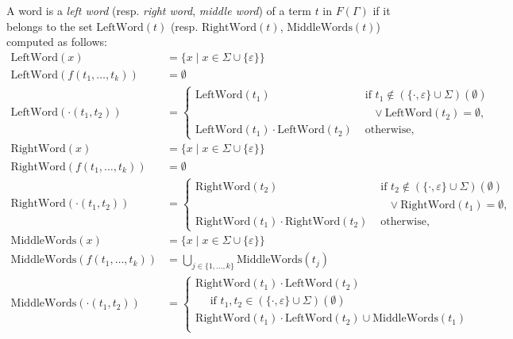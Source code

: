 \documentclass[a4paper]{llncs}
\begin{document}
  \begin{definition}
        A word is a \emph{left word} (resp. \emph{right word}, \emph{middle word}) of a term $t$ in $F(\Gamma)$ if it belongs to the set $\mathrm{LeftWord}(t)$ (resp. $\mathrm{RightWord}(t)$, $\mathrm{MiddleWords}(t)$) computed as follows:
        \begin{align*}
          \mathrm{LeftWord}(x)& =\{x\mid x\in\Sigma\cup\{\varepsilon\}\}\\
          \mathrm{LeftWord}(f(t_1,\ldots,t_k))&=\emptyset\\
          \mathrm{LeftWord}(\cdot(t_1,t_2))&=
        \begin{cases}
            \mathrm{LeftWord}(t_1) & \text{ if } t_1\notin (\{\cdot,\varepsilon\}\cup\Sigma)(\emptyset)\\
            & \quad \vee \mathrm{LeftWord}(t_2)=\emptyset,\\
            \mathrm{LeftWord}(t_1)\cdot \mathrm{LeftWord}(t_2) & \text{ otherwise,}
          \end{cases}\\
          \mathrm{RightWord}(x)&=\{x\mid x\in\Sigma\cup\{\varepsilon\}\}\\
          \mathrm{RightWord}(f(t_1,\ldots,t_k))&=\emptyset\\
          \mathrm{RightWord}(\cdot(t_1,t_2))&=
        \begin{cases}
            \mathrm{RightWord}(t_2) & \text{ if } t_2\notin (\{\cdot,\varepsilon\}\cup\Sigma)(\emptyset)\\
            &\quad \vee \mathrm{RightWord}(t_1)=\emptyset,\\
            \mathrm{RightWord}(t_1)\cdot \mathrm{RightWord}(t_2) & \text{ otherwise,}
          \end{cases}\\
          \mathrm{MiddleWords}(x)&=\{x\mid x\in\Sigma\cup\{\varepsilon\}\}\\
          \mathrm{MiddleWords}(f(t_1,\ldots,t_k))&=\bigcup_{j\in\{1,\ldots,k\}} \mathrm{MiddleWords}(t_j)\\
          \mathrm{MiddleWords}(\cdot(t_1,t_2))&=
        \begin{cases}
            \mathrm{RightWord}(t_1)\cdot \mathrm{LeftWord}(t_2) \\
            \quad\text{ if } t_1,t_2\in (\{\cdot,\varepsilon\}\cup\Sigma)(\emptyset)\\
            \mathrm{RightWord}(t_1)\cdot \mathrm{LeftWord}(t_2) \cup \mathrm{MiddleWords}(t_1)\\

\end{cases}
\end{align*}
\end{definition}
\end{document}

